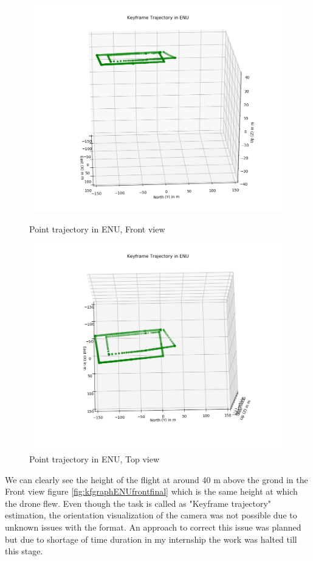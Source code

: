 \begin{figure}[hbt!]
    \centering
    \includegraphics[height=9cm, width=13cm]{Images/kftrajectoryENUfinalFront.png}
    \caption{Point trajectory in ENU, Front view}
    \label{fig:kfgraphENUfrontfinal}
    \includegraphics[height=9cm, width=13cm]{Images/kftrajectoryENUfinalTop.png}
    \caption{Point trajectory in ENU, Top view}
    \label{fig:kfgraphENUTopfinal}
\end{figure}

\newpage
We can clearly see the height of the flight at around 40 m above the grond in the Front view figure \ref{fig:kfgraphENUfrontfinal} which is the same height at which the drone flew. Even though the task is called as "Keyframe trajectory" estimation, the orientation visualization of the camera was not possible due to unknown issues with the format. An approach to correct this issue was planned but due to shortage of time duration in my internship the work was halted till this stage.


